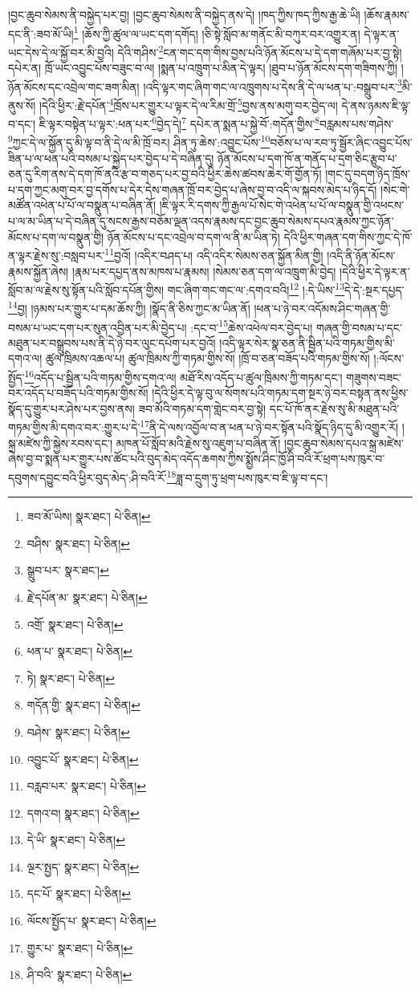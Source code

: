 །བྱང་ཆུབ་སེམས་ནི་བསྐྱེད་པར་བྱ། །བྱང་ཆུབ་སེམས་ནི་བསྐྱེད་ནས་དེ། །ཁད་ཀྱིས་ཁད་ཀྱིས་རྒྱ་ཆེ་ཡི། །ཆོས་རྣམས་དང་ནི་:ཟབ་མོ་ཡི།\footnote{ཟབ་མོ་ཡིས།  སྣར་ཐང་།  པེ་ཅིན། } །ཆོས་ཀྱི་ཚུལ་ལ་ཡང་དག་དགོད། །ཅི་སྟེ་སློབ་མ་གནོང་མི་བཀུར་བར་འགྱུར་ན། དེ་ལྟར་ན་ཡང་དེས་དེ་ལ་སྐྱོ་བར་མི་བྱའི། དེའི་གཤིས་\footnote{བཤིས་  སྣར་ཐང་།  པེ་ཅིན། }ངན་གང་དག་གིས་བྱས་པའི་ཉོན་མོངས་པ་དེ་དག་གཞོམ་པར་བྱ་སྟེ། དཔེར་ན། ཁྲོ་ཡང་འབྱུང་པོས་བཟུང་བ་ལ། །སྨན་པ་འཁྲུག་པ་མིན་དེ་ལྟར། །ཐུབ་པ་ཉོན་མོངས་དག་གཟིགས་ཀྱི། །
ཉོན་མོངས་དང་འབྲེལ་གང་ཟག་མིན། །འདི་ལྟར་གང་ཞིག་གང་ལ་འཁྲུགས་པ་དེས་ནི་དེ་ལ་ཕན་པ་:བསྒྲུབ་པར་\footnote{སྒྲུབ་པར་  སྣར་ཐང་། }མི་ནུས་སོ། །དེའི་ཕྱིར་:རྗེ་དཔོན་\footnote{རྗེ་དཔོན་མ་  སྣར་ཐང་།  པེ་ཅིན། }ཁྲོས་པར་གྱུར་པ་ལྟར་དེ་ལ་རིམ་གྲོ་\footnote{འགྲོ་  སྣར་ཐང་།  པེ་ཅིན། }བྱས་ནས་མགུ་བར་བྱེད་ལ། དེ་ནས་ཉམས་ཇི་ལྟ་བ་དང་། ཇི་ལྟར་བསྟེན་པ་ལྟར་:ཕན་པར་\footnote{ཕན་པ་  སྣར་ཐང་།  པེ་ཅིན། }བྱེད་དེ།\footnote{ཏེ།  སྣར་ཐང་།  པེ་ཅིན། } དཔེར་ན་སྨན་པ་སྐྱེ་བོ་:གདོན་གྱིས་\footnote{གདོན་གྱི་  སྣར་ཐང་།  པེ་ཅིན། }བརླམས་པས་གཤེས་\footnote{བཤེས་  སྣར་ཐང་།  པེ་ཅིན། }ཀྱང་དེ་ལ་སྐྱོན་དུ་མི་ལྟ་བ་ནི་དེ་ལ་མི་ཁྲོ་བར། ཤིན་ཏུ་ཆེས་:འབྱུང་པོས་\footnote{འབྱུང་པོ་  སྣར་ཐང་།  པེ་ཅིན། }བཅོས་པ་ལ་རབ་ཏུ་སྦྱོར་ཞིང་འབྱུང་པོས་ཟིན་པ་ལ་ཕན་པའི་བསམ་པ་སྐྱེད་པར་བྱེད་པ་དེ་བཞིན་དུ། ཉོན་མོངས་པ་དག་ཁོ་ན་གནོད་པ་དྲག་ཅིང་རྩུབ་པ་ཅན་དུ་རིག་ནས་དེ་དག་ཁོ་ནའི་རྩ་བ་གཅད་པར་བྱ་བའི་ཕྱིར་ཆེས་ཚབས་ཆེར་གོ་གྱོན་ཏོ། །གང་དུ་བདག་ཉིད་ཁྲོས་པ་དག་ཀྱང་མགུ་བར་བྱ་དགོས་པ་དེར་དེས་གཞན་ཁྲོ་བར་བྱེད་པ་ཞེས་བྱ་བ་འདི་ལ་སྐབས་མེད་པ་ཉིད་དོ། །སེང་གེ་མཚོན་འཕེན་པ་པོ་ལ་བསྣུན་པ་བཞིན་ནོ། །ཇི་ལྟར་རི་དགས་ཀྱི་རྒྱལ་པོ་སེང་གེ་འཕེན་པ་པོ་ལ་བསྣུན་གྱི་འཕངས་པ་ལ་མ་ཡིན་པ་དེ་བཞིན་དུ་སངས་རྒྱས་བཅོམ་ལྡན་འདས་རྣམས་དང་བྱང་ཆུབ་སེམས་དཔའ་རྣམས་ཀྱང་ཉོན་མོངས་པ་དག་ལ་བསྣུན་གྱི། ཉོན་མོངས་པ་དང་འབྲེལ་བ་དག་ལ་ནི་མ་ཡིན་ཏེ། དེའི་ཕྱིར་གཞན་དག་གིས་ཀྱང་དེ་ཁོ་ན་ལྟར་རྗེས་སུ་:བསླབ་པར་\footnote{བརླབ་པར་  སྣར་ཐང་།  པེ་ཅིན། }བྱའོ། །འདིར་བཤད་པ། འདི་འདིར་སེམས་ཅན་སྐྱོན་མིན་གྱི། །འདི་ནི་ཉོན་མོངས་རྣམས་སྐྱོན་ཞེས། །རྣམ་པར་དཔྱད་ནས་མཁས་པ་རྣམས། །སེམས་ཅན་དག་ལ་འཁྲུག་མི་བྱེད། །དེའི་ཕྱིར་དེ་ལྟར་ན་སློབ་མ་ལ་རྗེས་སུ་སྟོན་པའི་སློབ་དཔོན་གྱིས། གང་ཞིག་གང་གང་ལ་:དགའ་བའི།\footnote{དགའ་བ།  སྣར་ཐང་།  པེ་ཅིན། } །:དེ་ཡིས་\footnote{དེ་ཡི་  སྣར་ཐང་།  པེ་ཅིན། }དེ་དེ་:སྔར་དཔྱད་\footnote{ལྔར་སྤྱད་  སྣར་ཐང་།  པེ་ཅིན། }བྱ། །ཉམས་པར་གྱུར་པ་དམ་ཆོས་ཀྱི། །སྣོད་ནི་ཅིས་ཀྱང་མ་ཡིན་ནོ། །ཕན་པ་ཉེ་བར་འདོམས་ཤིང་གཞན་གྱི་བསམ་པ་ཡང་དག་པར་སུན་འབྱིན་པར་མི་བྱེད་པ། :དང་བ་\footnote{དང་པོ་  སྣར་ཐང་།  པེ་ཅིན། }ཆེས་འཕེལ་བར་བྱེད་པ། གཞན་གྱི་བསམ་པ་དང་མཐུན་པར་བསྒྲུབས་པས་ནི་དེ་ཉེ་བར་ལུང་དཔོག་པར་བྱའོ། །འདི་ལྟར་སེར་སྣ་ཅན་ནི་སྦྱིན་པའི་གཏམ་གྱིས་མི་དགའ་ལ། ཚུལ་ཁྲིམས་འཆལ་པ། ཚུལ་ཁྲིམས་ཀྱི་གཏམ་གྱིས་སོ། །ཁྲོ་བ་ཅན་བཟོད་པའི་གཏམ་གྱིས་སོ། །:ལོངས་སྤྱོད་\footnote{ལོངས་སྤྱོད་པ་  སྣར་ཐང་།  པེ་ཅིན། }འདོད་པ་སྦྱིན་པའི་གཏམ་གྱིས་དགའ་ལ། མཐོ་རིས་འདོད་པ་ཚུལ་ཁྲིམས་ཀྱི་གཏམ་དང་། གཟུགས་བཟང་བར་འདོད་པ་བཟོད་པའི་གཏམ་གྱིས་སོ། །དེའི་ཕྱིར་དེ་ལྟ་བུ་ལ་སོགས་པའི་གཏམ་དག་སྔར་ཉེ་བར་བསྟན་ནས་ཕྱིས་སྣོད་དུ་གྱུར་པར་ཤེས་པར་བྱས་ནས། ཟབ་མོའི་གཏམ་དག་གླེང་བར་བྱ་སྟེ། དང་པོ་ཁོ་ནར་རྗེས་སུ་མི་མཐུན་པའི་གཏམ་གྱིས་མི་དགའ་བར་:གྱུར་པ་དེ་\footnote{གྱུར་པ་  སྣར་ཐང་།  པེ་ཅིན། }ནི་དེ་ལས་འབྱོལ་བ་ན་ཕན་པ་ཉེ་བར་སྟོན་པའི་སྣོད་ཉིད་དུ་མི་འགྱུར་རོ། །སྐྲ་མཛེས་ཀྱི་སྐྱེས་རབས་དང་། མཁན་པོ་སློབ་མའི་རྗེས་སུ་འཇུག་པ་བཞིན་ནོ། །བྱང་ཆུབ་སེམས་དཔའ་སྐྲ་མཛེས་ཞེས་བྱ་བ་སྨན་པར་གྱུར་པས་ཚོང་པའི་བུད་མེད་འདོད་ཆགས་ཀྱིས་སྨྱོས་ཤིང་ཁྱོ་ཤི་བའི་རོ་ཕྲག་པས་ཁུར་བ་དབུགས་དབྱུང་བའི་ཕྱིར་བུད་མེད་:ཤི་བའི་རོ་\footnote{ཤི་བའི་  སྣར་ཐང་།  པེ་ཅིན། }ཟླ་བ་དྲུག་ཏུ་ཕྲག་པས་ཁུར་བ་ཇི་ལྟ་བ་དང་། 